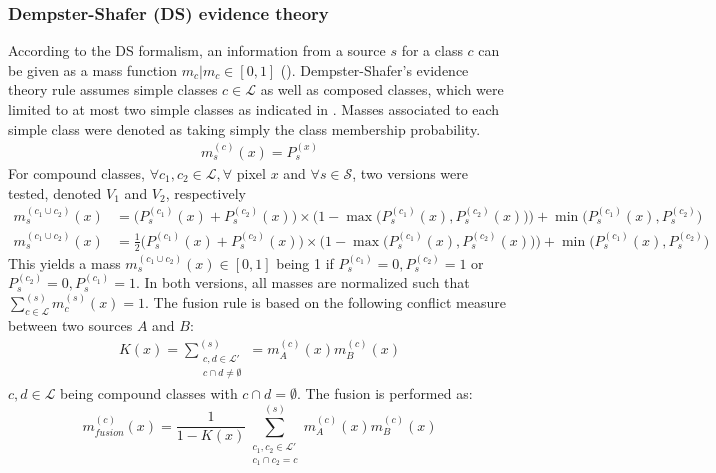 \documentclass[10pt]{article}
\begin{document}
\subsubsection{Dempster-Shafer (DS) evidence theory}\label{sec:DS}
According to the DS formalism, an information from a source $s$ for a class $c$ can be given as a mass function $m_c\vert m_c\in [0,1]$ (\cite{shafer-evidence}). Dempster-Shafer's evidence theory rule assumes simple classes $c\in \mathcal{L}$ as well as composed classes, which were limited to at most two simple classes as indicated in \cite{ouerghemmi_two-step_2017}. Masses associated to each simple class were denoted as taking simply the class membership probability.
\begin{align}
    m_s^{(c)}(x)=P_s^{(x)}
\end{align}
For compound classes, $\forall c_1,c_2\in \mathcal{L}, \forall$ pixel $x$ and $\forall s\in \mathcal{S}$, two versions were tested, denoted $V_1$ and $V_2$, respectively
\begin{align}
    m_s^{(c_1\cup c_2)}(x)&=\big(P_s^{(c_1)}(x)+P_s^{(c_2)}(x)\big)\times \Big(1-\max\big(P_s^{(c_1)}(x),P_s^{(c_2)}(x)\big)\Big)+\min\big(P_s^{(c_1)}(x),P_s^{(c_2)}\big)\\
    m_s^{(c_1\cup c_2)}(x)&=\frac{1}{2}\big(P_s^{(c_1)}(x)+P_s^{(c_2)}(x)\big)\times \Big(1-\max\big(P_s^{(c_1)}(x),P_s^{(c_2)}(x)\big)\Big)+\min\big(P_s^{(c_1)}(x),P_s^{(c_2)}\big)
\end{align}
This yields a mass $m_s^{(c_1\cup c_2)}(x)\in [0,1]$ being 1 if $P_s^{(c_1)}=0, P_s^{(c_2)}=1$ or $P_s^{(c_2)}=0, P_s^{(c_1)}=1$. In both versions, all masses are normalized such that $\sum_{c \in \mathcal{L}}^{(s)}m_c^{(s)}(x)=1$.
The fusion rule is based on the following conflict measure between two sources $A$ and $B$:
\begin{align}
    K(x)=\sum_{\substack{c,d\in\mathcal{L}'\\c\cap d\neq\emptyset}}^{(s)}=m_A^{(c)}(x)m_B^{(c)}(x)
\end{align}
$c,d\in\mathcal{L}$ being compound classes with $c\cap d =\emptyset$. The fusion is performed as:
\begin{equation}
    m_{fusion}^{(c)}(x)=\frac{1}{1-K(x)}\sum_{\substack{c_1,c_2\in\mathcal{L}'\\c_1 \cap c_2 = c}}^{(s)}m_A^{(c)}(x)m_B^{(c)}(x)
\end{equation}
\end{document}
